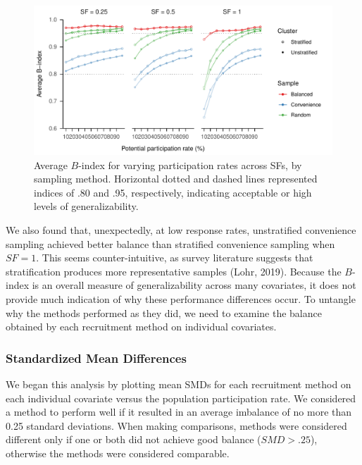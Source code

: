 \documentclass[
  man,floatsintext]{apa6}
\begin{document}
\begin{figure}
\centering
\includegraphics{6---Paper_files/figure-latex/fig-avg-B-1.pdf}
\caption{\label{fig:fig-avg-B}Average \(B\)-index for varying participation rates across SFs, by sampling method. Horizontal dotted and dashed lines represented indices of .80 and .95, respectively, indicating acceptable or high levels of generalizability.}
\end{figure}

 We also found that, unexpectedly, at low response rates, unstratified convenience sampling achieved better balance than stratified convenience sampling when \(SF = 1\). This seems counter-intuitive, as survey literature suggests that stratification produces more representative samples (Lohr, 2019). Because the \(B\)-index is an overall measure of generalizability across many covariates, it does not provide much indication of why these performance differences occur. To untangle why the methods performed as they did, we need to examine the balance obtained by each recruitment method on individual covariates.

\hypertarget{standardized-mean-differences}{%
\subsubsection*{Standardized Mean Differences}\label{standardized-mean-differences}}

We began this analysis by plotting mean SMDs for each recruitment method on each individual covariate versus the population participation rate. We considered a method to perform well if it resulted in an average imbalance of no more than 0.25 standard deviations. When making comparisons, methods were considered different only if one or both did not achieve good balance (\(SMD > .25\)), otherwise the methods were considered comparable.
\end{document}
